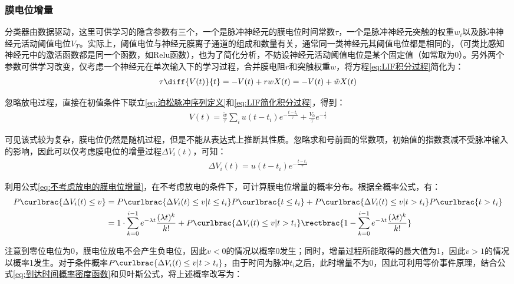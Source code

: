 \documentclass[11pt]{article}
\begin{document}
\subsubsection{膜电位增量}
分类器由数据驱动，这里可供学习的隐含参数有三个，一个是脉冲神经元的膜电位时间常数$\tau$，一个是脉冲神经元突触的权重$w_i$以及脉冲神经元活动阈值电位$V_T$。实际上，阈值电位与神经元膜离子通道的组成和数量有关，通常同一类神经元其阈值电位都是相同的，（可类比感知神经元中的激活函数都是同一个函数，如Relu函数），也为了简化分析，不妨设神经元活动阈值电位是某个固定值（如常取为0）。另外两个参数可供学习改变，仅考虑一个神经元在单次输入下的学习过程，合并膜电阻$r$和突触权重$w$，将方程\ref{eq:LIF积分过程}简化为：
\begin{align}
  \tau\diff{V(t)}{t}=-V(t)+rwX(t)=-V(t)+\tilde{w}X(t)
  \label{eq:LIF简化积分过程}
\end{align}\par
忽略放电过程，直接在初值条件下联立\ref{eq:泊松脉冲序列定义}和\ref{eq:LIF简化积分过程}，得到：
\begin{align}
  V(t)=\frac{\tilde{w}}{\tau}\sum\limits_{i}u(t-t_i)e^{-\frac{t-t_i}{\tau}}+\frac{V_0}{\tau}e^{-\frac{t}{\tau}}
  \label{eq:LIF膜电位公式}
\end{align}\par
可见该式较为复杂，膜电位仍然是随机过程，但是不能从表达式上推断其性质。忽略求和号前面的常数项，初始值的指数衰减不受脉冲输入的影响，因此可以仅考虑膜电位的增量过程$\Delta V_i(t)$，可知：
\begin{align}
  \Delta V_i(t)=u(t-t_i)e^{-\frac{t-t_i}{\tau}}
  \label{eq:不考虑放电的膜电位增量}
\end{align}\par
利用公式\ref{eq:不考虑放电的膜电位增量}，在不考虑放电的条件下，可计算膜电位增量的概率分布。根据全概率公式，有：
\begin{align}
  \begin{aligned}
    P\curlbrac{\Delta V_i(t)\le v} & =P\curlbrac{\Delta V_i(t)\le v|t\le t_i}P\curlbrac{t\le t_i}+P\curlbrac{\Delta V_i(t)\le v|t> t_i}P\curlbrac{t>t_i}                                                    \\
                                   & =1\cdot\sum_{k=0}^{i-1}e^{-\lambda t}\frac{(\lambda t)^k}{k!}+P\curlbrac{\Delta V_i(t)\le v|t> t_i}\rectbrac{1-\sum_{k=0}^{i-1}e^{-\lambda t}\frac{(\lambda t)^k}{k!}}
  \end{aligned}\label{eq:膜电位增量概率分布}
\end{align}\par
注意到零位电位为0，膜电位放电不会产生负电位，因此$v<0$的情况以概率0发生；同时，增量过程所能取得的最大值为1，因此$v>1$的情况以概率1发生。对于条件概率$P\curlbrac{\Delta V_i(t)\le v|t> t_i}$，由于时间为脉冲$t_i$之后，此时增量不为0，因此可利用等价事件原理，结合公式\ref{eq:到达时间概率密度函数}和贝叶斯公式，将上述概率改写为：
\end{document}
